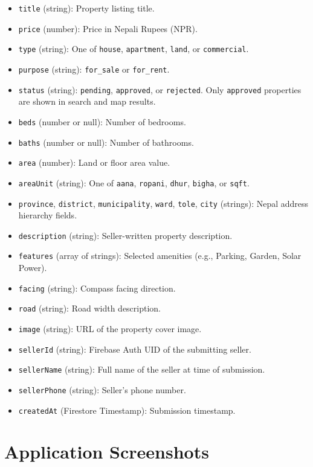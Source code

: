 \documentclass[12pt,a4paper]{report}
\begin{document}
\begin{itemize}[leftmargin=2.5em]
  \item \texttt{title} (string): Property listing title.
  \item \texttt{price} (number): Price in Nepali Rupees (NPR).
  \item \texttt{type} (string): One of \texttt{house}, \texttt{apartment},
    \texttt{land}, or \texttt{commercial}.
  \item \texttt{purpose} (string): \texttt{for\_sale} or \texttt{for\_rent}.
  \item \texttt{status} (string): \texttt{pending}, \texttt{approved}, or
    \texttt{rejected}. Only \texttt{approved} properties are shown in search
    and map results.
  \item \texttt{beds} (number or null): Number of bedrooms.
  \item \texttt{baths} (number or null): Number of bathrooms.
  \item \texttt{area} (number): Land or floor area value.
  \item \texttt{areaUnit} (string): One of \texttt{aana}, \texttt{ropani},
    \texttt{dhur}, \texttt{bigha}, or \texttt{sqft}.
  \item \texttt{province}, \texttt{district}, \texttt{municipality},
    \texttt{ward}, \texttt{tole}, \texttt{city} (strings): Nepal address
    hierarchy fields.
  \item \texttt{description} (string): Seller-written property description.
  \item \texttt{features} (array of strings): Selected amenities
    (e.g., Parking, Garden, Solar Power).
  \item \texttt{facing} (string): Compass facing direction.
  \item \texttt{road} (string): Road width description.
  \item \texttt{image} (string): URL of the property cover image.
  \item \texttt{sellerId} (string): Firebase Auth UID of the submitting seller.
  \item \texttt{sellerName} (string): Full name of the seller at time of
    submission.
  \item \texttt{sellerPhone} (string): Seller's phone number.
  \item \texttt{createdAt} (Firestore Timestamp): Submission timestamp.
\end{itemize}

\section{Application Screenshots}
\end{document}
